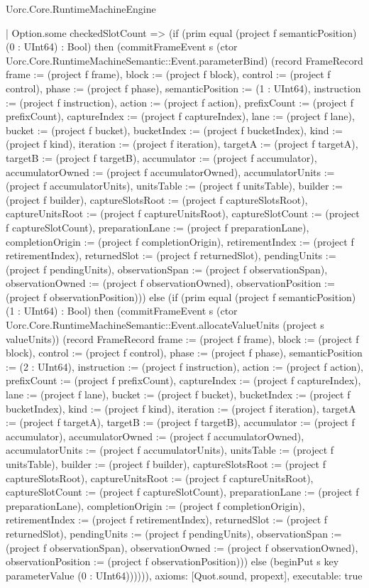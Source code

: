 \begin{lexlean}{Uorc.Core.RuntimeMachineEngine}
\begin{semanticmodule}
{      | Option.some checkedSlotCount => (if (prim equal (project f semanticPosition) (0 : UInt64) : Bool) then (commitFrameEvent s (ctor Uorc.Core.RuntimeMachineSemantic::Event.parameterBind) (record FrameRecord {frame := (project f frame), block := (project f block), control := (project f control), phase := (project f phase), semanticPosition := (1 : UInt64), instruction := (project f instruction), action := (project f action), prefixCount := (project f prefixCount), captureIndex := (project f captureIndex), lane := (project f lane), bucket := (project f bucket), bucketIndex := (project f bucketIndex), kind := (project f kind), iteration := (project f iteration), targetA := (project f targetA), targetB := (project f targetB), accumulator := (project f accumulator), accumulatorOwned := (project f accumulatorOwned), accumulatorUnits := (project f accumulatorUnits), unitsTable := (project f unitsTable), builder := (project f builder), captureSlotsRoot := (project f captureSlotsRoot), captureUnitsRoot := (project f captureUnitsRoot), captureSlotCount := (project f captureSlotCount), preparationLane := (project f preparationLane), completionOrigin := (project f completionOrigin), retirementIndex := (project f retirementIndex), returnedSlot := (project f returnedSlot), pendingUnits := (project f pendingUnits), observationSpan := (project f observationSpan), observationOwned := (project f observationOwned), observationPosition := (project f observationPosition)})) else (if (prim equal (project f semanticPosition) (1 : UInt64) : Bool) then (commitFrameEvent s (ctor Uorc.Core.RuntimeMachineSemantic::Event.allocateValueUnits (project s valueUnits)) (record FrameRecord {frame := (project f frame), block := (project f block), control := (project f control), phase := (project f phase), semanticPosition := (2 : UInt64), instruction := (project f instruction), action := (project f action), prefixCount := (project f prefixCount), captureIndex := (project f captureIndex), lane := (project f lane), bucket := (project f bucket), bucketIndex := (project f bucketIndex), kind := (project f kind), iteration := (project f iteration), targetA := (project f targetA), targetB := (project f targetB), accumulator := (project f accumulator), accumulatorOwned := (project f accumulatorOwned), accumulatorUnits := (project f accumulatorUnits), unitsTable := (project f unitsTable), builder := (project f builder), captureSlotsRoot := (project f captureSlotsRoot), captureUnitsRoot := (project f captureUnitsRoot), captureSlotCount := (project f captureSlotCount), preparationLane := (project f preparationLane), completionOrigin := (project f completionOrigin), retirementIndex := (project f retirementIndex), returnedSlot := (project f returnedSlot), pendingUnits := (project f pendingUnits), observationSpan := (project f observationSpan), observationOwned := (project f observationOwned), observationPosition := (project f observationPosition)})) else (beginPut s key parameterValue (0 : UInt64)))))),
  axioms: [Quot.sound, propext],
  executable: true
}


\end{semanticmodule}
\end{lexlean}
